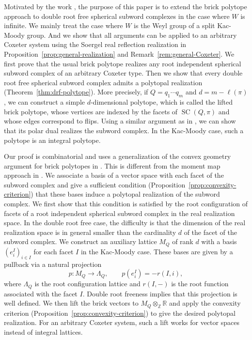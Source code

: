 \documentclass[11pt,a4paper]{article}
\theoremstyle{definition}
\theoremstyle{remark}
\newcommand{\SC}{\operatorname{SC}}
\numberwithin{equation}{section}
\begin{document}
Motivated by the work \cite{BGS}, the purpose of this paper is to extend the brick polytope approach to double root free spherical subword complexes in the case where $W$ is infinite. We mainly treat the case where $W$ is the Weyl group of a split Kac-Moody group. And we show that all arguments can be applied to an arbitrary Coxeter system using the Soergel real reflection realization in Proposition~\ref{prop:general-realization} and Remark~\ref{rem:general-Coxeter}. We first prove that the usual brick polytope realizes any root independent spherical subword complex of an arbitrary Coxeter type. Then we show that every double root free spherical subword complex admits a polytopal realization (Theorem~\ref{thm:drf-polytope}). More precisely, if $Q=q_1\cdots q_m$ and $d=m-\ell(\pi)$, we can construct a simple $d$-dimensional polytope, which is called the lifted brick polytope, whose vertices are indexed by the facets of $\SC(Q,\pi)$ and whose edges correspond to flips. Using a similar argument as in \cite{JS}, we can show that its polar dual realizes the subword complex. In the Kac-Moody case, such a polytope is an integral polytope.

Our proof is combinatorial and uses a generalization of the convex geometry argument for brick polytopes in \cite{PSbrick,JS}. This is different from the moment map approach in \cite{BGS}. We associate a basis of a vector space with each facet of the subword complex and give a sufficient condition (Proposition~\ref{prop:convexity-criterion}) that these bases induce a polytopal realization of the subword complex. We first show that this condition is satisfied by the root configuration of facets of a root independent spherical subword complex in the real realization space. In the double root free case, the difficulty is that the dimension of the real realization space is in general smaller than the cardinality $d$ of the facet of the subword complex. We construct an auxiliary lattice $M_Q$ of rank $d$ with a basis $(e_i^I)_{i\in I}$ for each facet $I$ in the Kac-Moody case. These bases are given by a pullback via a natural projection
\[
 p:M_Q\longrightarrow\Lambda_Q,\qquad p(e_i^I)=-r(I,i),
\]
where $\Lambda_Q$ is the root configuration lattice and $r(I,-)$ is the root function associated with the facet $I$. Double root freeness implies that this projection is well defined. We then lift the brick vectors to $M_Q\otimes_{\mathbb Z}\mathbb R$ and apply the convexity criterion (Proposition~\ref{prop:convexity-criterion}) to give the desired polytopal realization. For an arbitrary Coxeter system, such a lift works for vector spaces instead of integral lattices.
\end{document}
